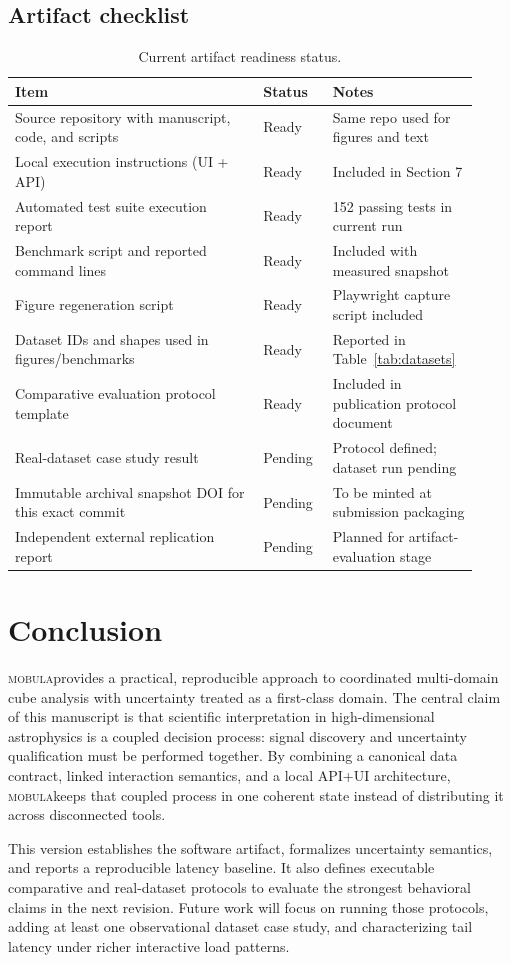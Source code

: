 \documentclass[11pt]{article}
\newcommand{\tool}{\textsc{mobula}}
\begin{document}
\subsection{Artifact checklist}
\begin{table}[t]
  \centering
  \small
  \begin{tabular}{p{0.50\linewidth}p{0.14\linewidth}p{0.28\linewidth}}
    \toprule
    Item & Status & Notes \\
    \midrule
    Source repository with manuscript, code, and scripts & Ready & Same repo used for figures and text \\
    Local execution instructions (UI + API) & Ready & Included in Section 7 \\
    Automated test suite execution report & Ready & 152 passing tests in current run \\
    Benchmark script and reported command lines & Ready & Included with measured snapshot \\
    Figure regeneration script & Ready & Playwright capture script included \\
    Dataset IDs and shapes used in figures/benchmarks & Ready & Reported in Table~\ref{tab:datasets} \\
    Comparative evaluation protocol template & Ready & Included in publication protocol document \\
    Real-dataset case study result & Pending & Protocol defined; dataset run pending \\
    Immutable archival snapshot DOI for this exact commit & Pending & To be minted at submission packaging \\
    Independent external replication report & Pending & Planned for artifact-evaluation stage \\
    \bottomrule
  \end{tabular}
  \caption{Current artifact readiness status.}
  \label{tab:artifact-checklist}
\end{table}

\section{Conclusion}
\tool provides a practical, reproducible approach to coordinated multi-domain cube analysis with uncertainty treated as a first-class domain. The central claim of this manuscript is that scientific interpretation in high-dimensional astrophysics is a coupled decision process: signal discovery and uncertainty qualification must be performed together. By combining a canonical data contract, linked interaction semantics, and a local API+UI architecture, \tool keeps that coupled process in one coherent state instead of distributing it across disconnected tools.

This version establishes the software artifact, formalizes uncertainty semantics, and reports a reproducible latency baseline. It also defines executable comparative and real-dataset protocols to evaluate the strongest behavioral claims in the next revision. Future work will focus on running those protocols, adding at least one observational dataset case study, and characterizing tail latency under richer interactive load patterns.



\end{document}
